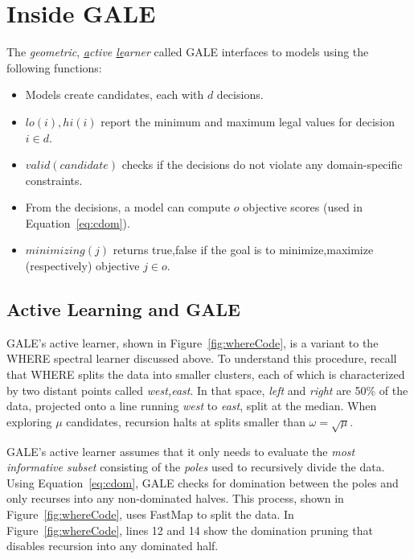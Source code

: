 \documentclass[10pt,journal,compsoc]{IEEEtran}
\newcommand{\eq}[1]{Equation~\ref{eq:#1}}
\newcommand{\bi}{\begin{itemize}}
\newcommand{\ei}{\end{itemize}}
\newcommand{\fig}[1]{Figure~\ref{fig:#1}}
\begin{document}
\section{Inside GALE}
The  {\em \underline{g}eometric}, {\em \underline{a}ctive \underline{le}arner} called 
GALE interfaces to models using the following functions:
\bi
\item Models create candidates, each  with $d$ decisions. 
\item $\mathit{lo}(i), \mathit{hi}(i)$ report the minimum and maximum
legal values for decision $i\in d$.
\item $\mathit{valid}(\mathit{candidate})$ 
checks if the decisions
do not violate any domain-specific constraints.
\item  From the decisions,
a model can compute $o$  objective scores (used in \eq{cdom}).
\item $\mathit{minimizing}(j)$ returns true,false if the goal
is to minimize,maximize (respectively) objective $j \in o$.
\ei




\subsection{Active Learning and GALE}\label{sec:al}
GALE's active learner, shown in \fig{whereCode}, is a
variant to the WHERE spectral
learner discussed above.
To understand this procedure, recall 
that WHERE splits the data
into smaller
 clusters, each of which is characterized by two
distant points called {\em west,east}. In that space,
{\em left} and {\em right} are  50\% of the
data, projected onto a line running {\em west} to {\em east},
 split at the median.
When exploring $\mu$ candidates, recursion
halts at splits smaller
than $\omega=\sqrt{\mu}$.


GALE's active learner assumes that it
only needs to evaluate
the 
{\em most informative subset} 
consisting of the {\em poles} used to
recursively divide the data. 
Using \eq{cdom}, GALE checks for domination between
the poles and only recurses into any non-dominated halves.
This process, shown in \fig{whereCode}, uses FastMap
to split the data. 
In  \fig{whereCode}, 
 lines 12 and 14 show the domination
pruning that disables recursion into any dominated half.
\end{document}

